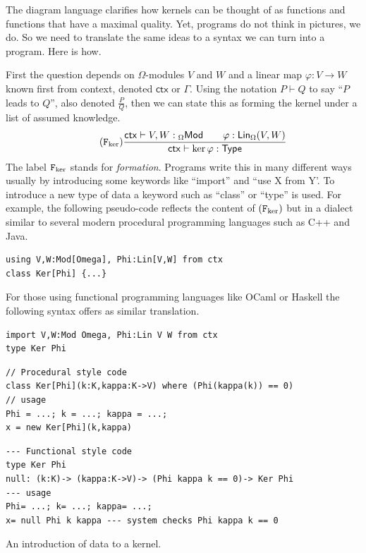 \documentclass[12pt,twoside,dvipsnames,letterpaper]{memoir}
\begin{document}
The diagram language clarifies how kernels can be thought of as functions and 
functions that have a maximal quality.  Yet, programs do not think in pictures, 
we do.  So we need to translate the same ideas to a syntax we can turn into a 
program.  Here is how.

First the question depends on $\Omega$-modules $V$ and $W$ and a linear map $\varphi:V\to W$ 
known first from context, denoted $\mathsf{ctx}$ or $\Gamma$.  Using the notation 
$P\vdash Q$ to say ``$P$ leads to $Q$'', also denoted $\frac{P}{Q}$, then we can 
state this as forming the kernel under a list of assumed knowledge.
\begin{gather}
    \tag{$\form{\ker}$}
    \frac{
        \mathsf{ctx} \vdash V,W:{_{\Omega} \mathsf{Mod}}\qquad
        \varphi:\mathsf{Lin}_{\Omega}(V,W)
    }{
        \mathsf{ctx}\vdash \ker\varphi:\mathsf{Type}
    }
\end{gather}
The label $\mathtt{F}_{\ker}$ stands for \emph{formation}.  Programs write this in
many different ways usually by introducing some keywords like ``import''
and ``use X from Y'.  To introduce a new type of data a keyword such as ``class''
or ``type'' is used.  For example, the following pseudo-code reflects the 
content of $(\mathtt{F}_{\ker})$ but in a dialect similar to several modern 
procedural programming 
languages such as C++ and Java.
\begin{lstlisting}[language=Sava]
using V,W:Mod[Omega], Phi:Lin[V,W] from ctx
class Ker[Phi] {...}
\end{lstlisting}
For those using functional programming languages like OCaml or Haskell the following syntax offers 
as similar translation.
\begin{lstlisting}[language=Hidris]
import V,W:Mod Omega, Phi:Lin V W from ctx
type Ker Phi
\end{lstlisting}



\begin{lstfloat}[!htbp]
\begin{lstlisting}[language=Sava]
// Procedural style code
class Ker[Phi](k:K,kappa:K->V) where (Phi(kappa(k)) == 0)
// usage 
Phi = ...; k = ...; kappa = ...;
x = new Ker[Phi](k,kappa)
\end{lstlisting}
\begin{lstlisting}[language=Hidris]
--- Functional style code
type Ker Phi
null: (k:K)-> (kappa:K->V)-> (Phi kappa k == 0)-> Ker Phi
--- usage 
Phi= ...; k= ...; kappa= ...;
x= null Phi k kappa --- system checks Phi kappa k == 0
\end{lstlisting}    
\caption{An introduction of data to a kernel.}
\label{lst:kernel-intro}
\end{lstfloat}
    
\end{document}
